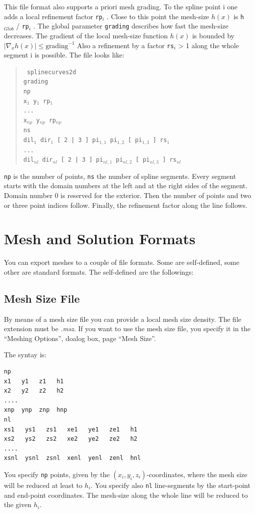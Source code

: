 \documentclass[12pt]{book}
\begin{document}
This file format also supports a priori mesh grading. To the spline 
point i one adds a local refinement factor {\tt rp}$_i$ . Close to 
this point the mesh-size $h(x)$ is {\tt h}$_{Glob}$ / {\tt rp}$_i$ .
The global parameter {\tt grading} describes how fast the mesh-size decreases.
The gradient of the local mesh-size function $h(x)$ is bounded by
$| \nabla_x h(x)| \leq \mbox{grading}^{-1}$ 
Also a refinement by a factor {\tt rs}$_i$ > 1 along the whole 
segment i is possible.
The file looks like:
%
\begin{quote}
\samepage
\tt 
splinecurves2d   \\
grading   \\
np   \\
x$_1$ y$_1$ rp$_1$ \\
...   \\
x$_{np}$ y$_{np}$ rp$_{np}$ \\
ns   \\
dil$_1$ dir$_1$ [ 2 | 3 ] pi$_{1,1}$ pi$_{1,2}$ [ pi$_{1,3}$ ] rs$_1$ \\
... \\
dil$_{nl}$ dir$_{nl}$ [ 2 | 3 ] pi$_{nl,1}$ pi$_{nl,2}$ [ pi$_{nl,3}$ ] rs$_{nl}$ \\
\end{quote}
%
{\tt np} is the number of points, {\tt ns} the number of spline segments.
Every segment starts with the domain numbers at the left and at the
right sides of the segment. Domain number 0 is reserved for the exterior.  
Then the number of points and two or three point indices follow.
Finally, the refinement factor along the line follows.


\chapter{Mesh and Solution Formats}

You can export meshes to a couple of file formats. Some are self-defined,
some other are standard formats. The self-defined are the followings:

\section{Mesh Size File}
By means of a mesh size file you can provide a local mesh size density. The file extension must be {\it .msz}. If you want to use the mesh size file, you specify it in the ``Meshing Options'', doalog box, page ``Mesh Size''.

The syntay is:
\begin{verbatim}
np
x1   y1   z1   h1
x2   y2   z2   h2
....
xnp  ynp  znp  hnp
nl
xs1   ys1   zs1   xe1   ye1   ze1   h1
xs2   ys2   zs2   xe2   ye2   ze2   h2
....
xsnl  ysnl  zsnl  xenl  yenl  zenl  hnl
\end{verbatim}
You specify {\tt np} points, given by the $(x_i,y_i,z_i)$-coordinates,
where the mesh size will be reduced at least to $h_i$. You specify
also {\tt nl} line-segments by the start-point and end-point
coordinates. The mesh-size along the whole line will be reduced to the given $h_i$.
\end{document}
